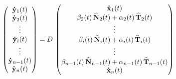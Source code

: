 \begin{equation}
\begin{pmatrix}
\doty_{1}(t) \\
\doty_{2}(t)\\
\vdots\\
\doty_{i}(t)\\
\vdots\\
\doty_{n-1}(t)\\
\doty_{n}(t)
\end{pmatrix}=D\,
\begin{pmatrix}
\dotx_{1}(t)\\
\beta_2(t)\,\hatN_2(t)+\alpha_2(t)\,\hatT_2(t)\\
\vdots \\
\beta_i(t)\,\hatN_i(t)+\alpha_i(t)\,\hatT_i(t)\\
\vdots \\
\beta_{n-1}(t)\,\hatN_{n-1}(t)+\alpha_{n-1}(t)\,\hatT_{n-1}(t)\\
\dotx_{n}(t)
\end{pmatrix}
\label{eq:y_velocities}
\end{equation}

